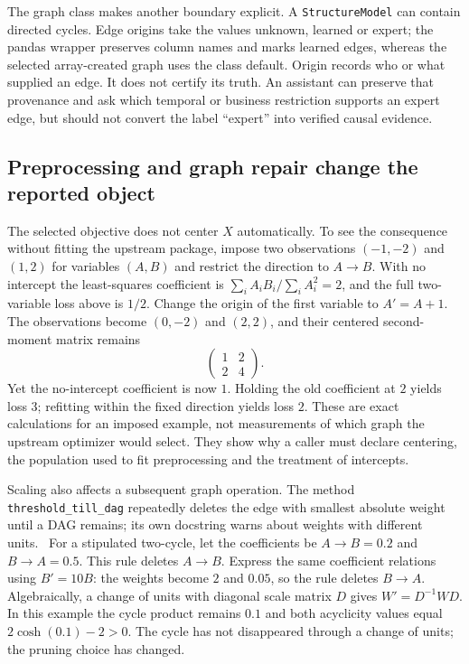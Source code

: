 The graph class makes another boundary explicit. A \texttt{StructureModel}
can contain directed cycles. Edge origins take the values unknown, learned
or expert; the pandas wrapper preserves column names and marks learned
edges, whereas the selected array-created graph uses the class default.
Origin records who or what supplied an edge. It does not certify its truth.
An assistant can preserve that provenance and ask which temporal or business
restriction supports an expert edge, but should not convert the label
``expert'' into verified causal evidence.~\citep{exec14_causalnex_primary}

\subsection{Preprocessing and graph repair change the reported object}

The selected objective does not center $X$ automatically. To see the
consequence without fitting the upstream package, impose two observations
$(-1,-2)$ and $(1,2)$ for variables $(A,B)$ and restrict the direction to
$A\to B$. With no intercept the least-squares coefficient is
$\sum_i A_iB_i/\sum_i A_i^2=2$, and the full two-variable loss above is $1/2$.
Change the origin of the first variable to $A'=A+1$. The observations become
$(0,-2)$ and $(2,2)$, and their centered second-moment matrix remains
\[
 \begin{pmatrix}1&2\\2&4\end{pmatrix}.
\]
Yet the no-intercept coefficient is now $1$. Holding the old coefficient at
$2$ yields loss $3$; refitting within the fixed direction yields loss $2$.
These are exact calculations for an imposed example, not measurements of
which graph the upstream optimizer would select. They show why a caller must
declare centering, the population used to fit preprocessing and the treatment
of intercepts.~\citep{exec14_causalnex_oracle}

Scaling also affects a subsequent graph operation. The method
\texttt{threshold\_till\_dag} repeatedly deletes the edge with smallest
absolute weight until a DAG remains; its own docstring warns about weights
with different units.~\citep{exec14_causalnex_primary}
For a stipulated two-cycle, let the coefficients be $A\to B=0.2$ and
$B\to A=0.5$. This rule deletes $A\to B$. Express the same coefficient
relations using $B'=10B$: the weights become $2$ and $0.05$, so the rule
deletes $B\to A$. Algebraically, a change of units with diagonal scale matrix
$D$ gives $W'=D^{-1}WD$. In this example the cycle product remains $0.1$ and
both acyclicity values equal $2\cosh(0.1)-2>0$. The cycle has not disappeared
through a change of units; the pruning choice has changed.
\citep{exec14_causalnex_oracle}

